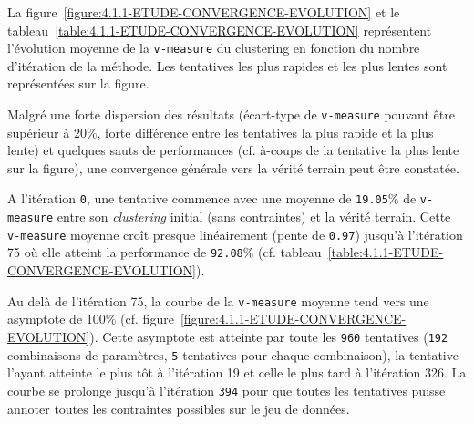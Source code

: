 			La figure~\ref{figure:4.1.1-ETUDE-CONVERGENCE-EVOLUTION} et le tableau~\ref{table:4.1.1-ETUDE-CONVERGENCE-EVOLUTION} représentent l'évolution moyenne de la \texttt{v-measure} du clustering en fonction du nombre d'itération de la méthode. Les tentatives les plus rapides et les plus lentes sont représentées sur la figure.
							
			Malgré une forte dispersion des résultats (écart-type de \texttt{v-measure} pouvant être supérieur à 20\%, forte différence entre les tentatives la plus rapide et la plus lente) et quelques sauts de performances (cf. à-coups de la tentative la plus lente sur la figure), une convergence générale vers la vérité terrain peut être constatée.
			
			A l'itération \texttt{0}, une tentative commence avec une moyenne de \texttt{19.05}\% de \texttt{v-measure}  entre son \textit{clustering} initial (sans contraintes) et la vérité terrain.
			Cette \texttt{v-measure} moyenne croît presque linéairement (pente de \texttt{0.97}) jusqu'à l'itération 75 où elle atteint la performance de \texttt{92.08}\% (cf. tableau~\ref{table:4.1.1-ETUDE-CONVERGENCE-EVOLUTION}).

			Au delà de l'itération 75, la courbe de la \texttt{v-measure} moyenne tend vers une asymptote de {100}\% (cf. figure~\ref{figure:4.1.1-ETUDE-CONVERGENCE-EVOLUTION}).
			Cette asymptote est atteinte par toute les \texttt{960} tentatives (\texttt{192} combinaisons de paramètres, \texttt{5} tentatives pour chaque combinaison), la tentative l'ayant atteinte le plus tôt à l'itération 19 et celle le plus tard à l'itération 326.
			La courbe se prolonge jusqu'à l'itération \texttt{394} pour que toutes les tentatives puisse annoter toutes les contraintes possibles sur le jeu de données.
			
